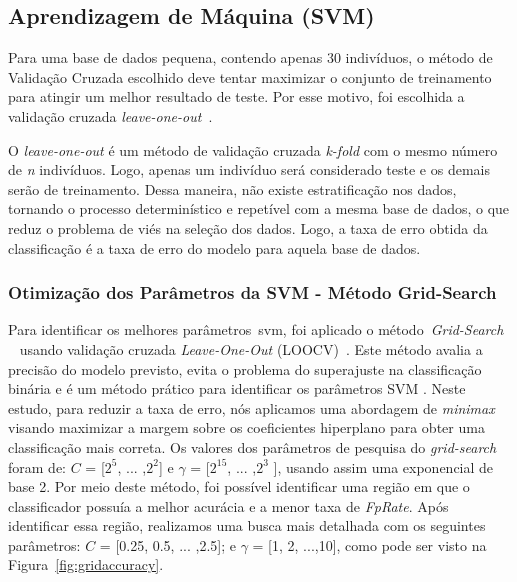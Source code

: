 \subsection{Aprendizagem de Máquina (SVM)}

Para uma base de dados pequena, contendo apenas 30 indivíduos, o método de Validação Cruzada escolhido deve tentar maximizar o conjunto de treinamento para atingir um melhor resultado de teste. Por esse motivo, foi escolhida a validação cruzada \textit{leave-one-out}~\cite{kantardzic2011data}. 

O \textit{leave-one-out} é um método de validação cruzada \textit{k-fold} com o mesmo número de \textit{n} indivíduos. Logo, apenas um indivíduo será considerado teste e os demais serão de treinamento. Dessa maneira, não existe estratificação nos dados, tornando o processo determinístico e repetível com a mesma base de dados, o que reduz o problema de viés na seleção dos dados. Logo, a taxa de erro obtida da classificação é a taxa de erro do modelo para aquela base de dados. 

\subsubsection{Otimização dos Parâmetros da SVM - Método Grid-Search}

Para identificar os melhores parâmetros~\ac{svm}, foi aplicado o método~\textit{Grid-Search} ~\cite{gridsearchsvm2010} usando validação cruzada \textit{Leave-One-Out} (LOOCV)~\cite{kantardzic2011data}. Este método avalia a precisão do modelo previsto, evita o problema do superajuste na classificação binária e é um método prático para identificar os parâmetros SVM . Neste estudo, para reduzir a taxa de erro, nós aplicamos uma abordagem de \textit{minimax} visando maximizar a margem sobre os coeficientes hiperplano para obter uma classificação mais correta. Os valores dos parâmetros de pesquisa do \textit{grid-search} foram de: $C$ = [$2^5$, ... ,$2^2$] e $\gamma$ = [$2^{15}$, ... ,$2^3$ ], usando assim uma exponencial de base 2. Por meio deste método, foi possível identificar uma região em que o classificador possuía a melhor acurácia e a menor taxa de \textit{FpRate}. Após identificar essa região, realizamos uma busca mais detalhada com os seguintes parâmetros: $C$ = [0.25, 0.5, ... ,2.5]; e $\gamma$ = [1, 2,
 ...,10], como pode ser visto na Figura~\ref{fig:gridaccuracy}.


